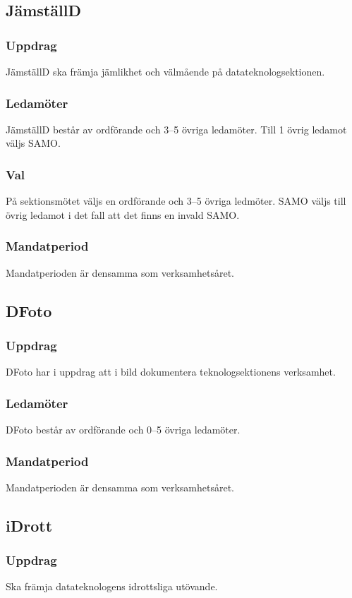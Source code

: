 \subsection{JämställD}
\subsubsection{Uppdrag}
JämställD ska främja jämlikhet och välmående på datateknologsektionen.
\subsubsection{Ledamöter}
JämställD består av ordförande och 3--5 övriga ledamöter. Till 1 övrig ledamot väljs SAMO.
\subsubsection{Val}
På sektionsmötet väljs en ordförande och 3--5 övriga ledmöter. 
SAMO väljs till övrig ledamot i det fall att det finns en invald SAMO. 
\subsubsection{Mandatperiod}
Mandatperioden är densamma som verksamhetsåret.

\subsection{DFoto}
\subsubsection{Uppdrag}
DFoto har i uppdrag att i bild dokumentera teknologsektionens verksamhet.
\subsubsection{Ledamöter}
DFoto består av ordförande och 0--5 övriga ledamöter.
\subsubsection{Mandatperiod}
Mandatperioden är densamma som verksamhetsåret.

\subsection{iDrott}
\subsubsection{Uppdrag}
Ska främja datateknologens idrottsliga utövande. 
